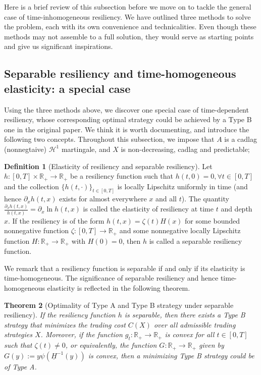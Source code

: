 \documentclass[openany,oneside]{article}
\newtheorem{thm}{Theorem}[section]
\theoremstyle{definition}
\newtheorem{defn}[thm]{Definition}
\theoremstyle{remark}
\begin{document}
Here is a brief review of this subsection before we move on to tackle the general case of time-inhomogeneous resiliency. We have outlined three methods to solve the problem, each with its own convenience and technicalities. Even though these methods may not assemble to a full solution, they would serve as starting points and give us significant inspirations.


\subsection{Separable resiliency and time-homogeneous elasticity: a special case}
Using the three methods above, we discover one special case of time-dependent resiliency, whose corresponding optimal strategy could be achieved by a Type B one in the original paper. We think it is worth documenting, and introduce the following two concepts. Throughout this subsection, we impose that $A$ is a cadlag (nonnegtaive) $\mathcal{H}^1$ martingale, and $X$ is non-decreasing, cadlag and predictable;

\begin{defn}[Elasticity of resiliency and separable resiliency]
Let $h:[0,T]\times \mathbb{R}_+ \to \mathbb{R}_+$ be a resiliency function such that $h(t,0)=0, \forall t\in[0,T]$ and the collection $\{h(t,\cdot)\}_{t\in[0,T]}$ is locally Lipschitz uniformly in time (and hence $\partial_x h(t,x)$ exists for almost everywhere $x$ and all $t$). The quantity $\frac{\partial_x h(t,x)}{h(t,x)} = \partial_x \ln h(t,x)$ is called the elasticity of resiliency at time $t$ and depth $x$. If the resiliency is of the form $h(t,x) = \zeta(t) H(x)$ for some bounded nonnegative function $\zeta:[0,T] \to \mathbb{R}_+$ and some nonnegative locally Lipschitz function $H:\mathbb{R}_+ \to \mathbb{R}_+$ with $H(0)=0$, then $h$ is called a separable resiliency function.
\end{defn}

We remark that a resiliency function is separable if and only if its elasticity is time-homogeneous. The significance of separable resiliency and hence time-homogeneous elasticity is reflected in the following theorem.

\begin{thm}[Optimality of Type A and Type B strategy under separable resiliency]
If the resiliency function $h$ is separable, then there exists a Type B strategy that minimizes the trading cost $C(X)$ over all admissible trading strategies $X$. Moreover, if the function $g_t:\mathbb{R}_+ \to \mathbb{R}_+$ is convex for all $t\in [0,T]$ such that $\zeta(t)\ne 0$, or equivalently, the function $G:\mathbb{R}_+ \to \mathbb{R}_+$ given by $G(y):= y \psi(\underline{H}^{-1}(y))$ is convex, then a minimizing Type B strategy could be of Type A.
\end{thm}
\end{document}
